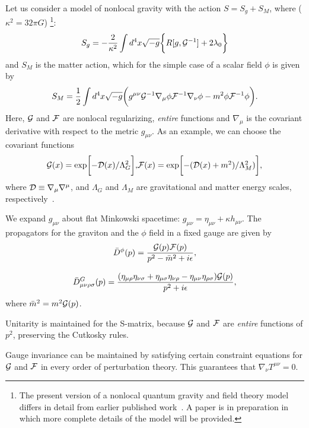 \documentclass[a4paper,12pt]{article}
\begin{document}
Let us consider a model of nonlocal gravity with the action
$S=S_g+S_M$, where ($\kappa^2=32\pi G$)
\footnote{The present version of a nonlocal quantum gravity and
field theory model differs in detail from
earlier published work~\cite{Moffat,Moffat2}. A paper is in preparation in which more complete
details of the model will be provided.}:
\begin{equation}
S_g=-\frac{2}{\kappa^2}\int d^4x\sqrt{-g}\biggl\{R[g,{\cal
G}^{-1}]+2\lambda_0\biggr\}
\end{equation}
and $S_M$ is the matter action, which for the simple case of
a scalar field $\phi$ is given by
\begin{equation}
S_M=\frac{1}{2}\int d^4x\sqrt{-g}\biggl(g^{\mu\nu}{\cal
G}^{-1}\nabla_\mu\phi{\cal F}^{-1}\nabla_\nu\phi
-m^2\phi{\cal F}^{-1}\phi\biggr).
\end{equation}
Here, ${\cal G}$ and ${\cal F}$ are nonlocal regularizing,
{\it entire} functions and $\nabla_\mu$ is the covariant
derivative with respect to the metric $g_{\mu\nu}$. As an example,
we can choose the covariant
functions
\begin{equation}
{\cal G}(x)=\exp\biggl[-{\cal D}(x)/\Lambda_G^2\biggr],
$$ $$
{\cal F}(x)=\exp\biggl[-({\cal D}(x)+m^2)/\Lambda_M^2)\biggr],
\end{equation}
where ${\cal D}\equiv\nabla_\mu\nabla^\mu$, and $\Lambda_G$ and
$\Lambda_M$ are gravitational and matter energy scales,
respectively~\cite{Moffat,Moffat2}.

We expand $g_{\mu\nu}$ about flat Minkowski spacetime:
$g_{\mu\nu}=\eta_{\mu\nu}+\kappa h_{\mu\nu}$. The propagators for the
graviton and the $\phi$ field in a fixed gauge are given by
\begin{equation}
{\bar D}^\phi(p)=\frac{{\cal G}(p){\cal F}(p)}{p^2-{\bar m}^2+i\epsilon},
\end{equation}
$$ $$
\begin{equation}
{\bar D}^G_{\mu\nu\rho\sigma}(p)=\frac{(\eta_{\mu\rho}\eta_{\nu\sigma}
+\eta_{\mu\sigma}\eta_{\nu\rho}-\eta_{\mu\nu}\eta_{\rho\sigma})
{\cal G}(p)}{p^2+i\epsilon},
\end{equation}
where ${\bar m}^2=m^2{\cal G}(p)$.

Unitarity is maintained for the S-matrix, because ${\cal G}$ and
${\cal F}$ are {\it entire} functions of $p^2$, preserving the Cutkosky
rules.

Gauge invariance can be maintained by satisfying certain
constraint equations for ${\cal G}$ and ${\cal F}$ in every order of
perturbation theory.  This guarantees that $\nabla_\nu T^{\mu\nu}=0$.
\end{document}
